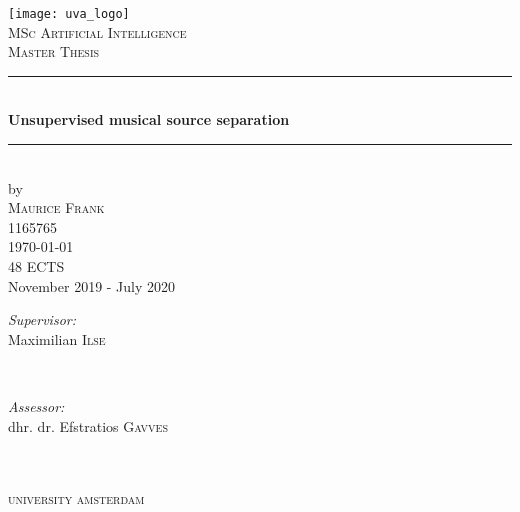 \begin{titlepage}
\begin{fullwidth}
\newcommand{\HRule}{\rule{\linewidth}{0.5mm}} %

\center %
\texttt{[image: uva\_logo]}\\[2.5cm]

\textsc{\Large MSc Artificial Intelligence}\\[0.2cm]
\textsc{\Large Master Thesis}\\[0.5cm]

\HRule \\[0.4cm]
{ \huge \bfseries Unsupervised musical source separation}\\[0.4cm] %
\HRule \\[0.5cm]


by\\[0.2cm]
\textsc{\Large Maurice Frank}\\[0.2cm]
1165765\\[1cm]

{\Large \today}\\[1cm]
48 ECTS\\ %

November 2019 - July 2020\\[1cm]%

\begin{minipage}[t]{0.4\textwidth}
\begin{flushleft} \large
\emph{Supervisor:} \\
Maximilian \textsc{Ilse}
\end{flushleft}
\end{minipage}
~
\begin{minipage}[t]{0.4\textwidth}
\begin{flushright} \large
\emph{Assessor:} \\
dhr. dr. Efstratios \textsc{Gavves}\\
\end{flushright}
\end{minipage}\\[2cm]


\framebox{\rule{0pt}{2.5cm}\rule{2.5cm}{0pt}}\\[0.5cm]
\textsc{\large university amsterdam}\\[1.0cm] %
\vfill %
\end{fullwidth}
\end{titlepage}
